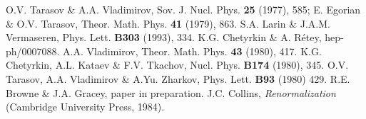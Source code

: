\documentclass[a4paper,11pt]{article}
\begin{document}
\begin{thebibliography}{99}
 O.V. Tarasov \& A.A. Vladimirov, Sov. J. Nucl. Phys. {\bf 25} 
(1977), 585;  
E. Egorian \& O.V. Tarasov, Theor. Math. Phys. {\bf 41} (1979), 863. 
 S.A. Larin \& J.A.M. Vermaseren, Phys. Lett. {\bf B303} (1993), 
334. 
 K.G. Chetyrkin \& A. R\'{e}tey, hep-ph/0007088.  
 A.A. Vladimirov, Theor. Math. Phys. {\bf 43} (1980), 417.
 K.G. Chetyrkin, A.L. Kataev \& F.V. Tkachov, Nucl. Phys. {\bf 
B174} (1980), 345.
 O.V. Tarasov, A.A. Vladimirov \& A.Yu. Zharkov, Phys. Lett. 
{\bf B93} (1980) 429.
 R.E. Browne \& J.A. Gracey, paper in preparation. 
 J.C. Collins, {\it Renormalization} (Cambridge University Press,
1984). 
\end{thebibliography}
\end{document}
